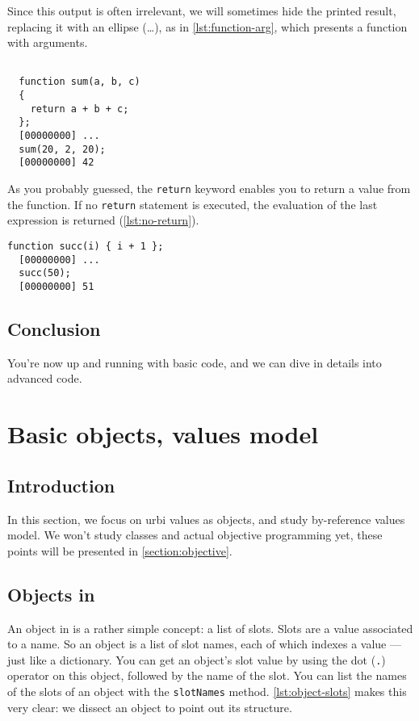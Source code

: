 \documentclass[openright,twoside,12pt]{report}
\newcommand{\lst}[1]{\autoref{lst:#1}}
\begin{document}
Since this output is often irrelevant, we will sometimes hide the
printed result, replacing it with an ellipse (\ldots), as in
\lst{function-arg}, which presents a function with arguments.

\begin{lstlisting}[caption=Function with
  arguments,label=lst:function-arg]

  function sum(a, b, c)
  {
    return a + b + c;
  };
  [00000000] ...
  sum(20, 2, 20);
  [00000000] 42
\end{lstlisting}

As you probably guessed, the \texttt{return} keyword enables you to
return a value from the function. If no \texttt{return} statement is
executed, the evaluation of the last expression is returned
(\lst{no-return}).

  \begin{lstlisting}[caption=Return value is the last evaluated value,
    label=lst:no-return]
  function succ(i) { i + 1 };
  [00000000] ...
  succ(50);
  [00000000] 51
\end{lstlisting}

\section{Conclusion}

You're now up and running with basic \urbi code, and we can dive in
details into advanced \urbi code.

\chapter{Basic objects, \urbi values model} %

\section{Introduction}

In this section, we focus on urbi values as objects, and study \urbi
by-reference values model. We won't study classes and actual objective
programming yet, these points will be presented in
\autoref{section:objective}.

\section{Objects in \urbi}

An object in \urbi is a rather simple concept: a list of slots. Slots
are a value associated to a name. So an object is a list of slot
names, each of which indexes a value --- just like a dictionary. You
can get an object's slot value by using the dot (\texttt{.}) operator
on this object, followed by the name of the slot. You can list the
names of the slots of an object with the \texttt{slotNames}
method. \lst{object-slots} makes this very clear: we dissect an object
to point out its structure.
\end{document}

